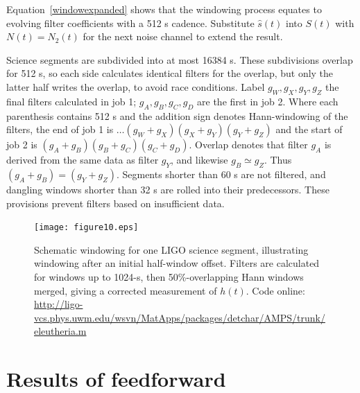 	Equation~\ref{windowexpanded} shows that the windowing process equates to evolving filter coefficients with a 512 s cadence. Substitute $\hat{s}(t)$ into $S(t)$ with $N(t) = N_2(t)$ for the next noise channel to extend the result.

            Science segments are subdivided into at most 16384 s. These subdivisions overlap for 512 s, so each side calculates identical filters for the overlap, but only the latter half writes the overlap, to avoid race conditions. Label $g_W, g_X, g_Y, g_Z$ the final filters calculated in job 1; $g_A, g_B, g_C, g_D$ are the first in job 2. Where each parenthesis contains 512 s and the addition sign denotes Hann-windowing of the filters, the end of job 1 is $\ldots(g_W+g_X)(g_X+g_Y)(g_Y+g_Z)$ and the start of job 2 is $(g_A+g_B)(g_B+g_C)(g_C+g_D)$. Overlap denotes that filter $g_A$ is derived from the same data as filter $g_Y$, and likewise $g_B \simeq g_Z$. Thus $(g_A+g_B)=(g_Y+g_Z)$. Segments shorter than 60 s are not filtered, and dangling windows shorter than 32 s are rolled into their predecessors. These provisions prevent filters based on insufficient data. 

\begin{figure}
\begin{center}
\texttt{[image: figure10.eps]}
\caption{Schematic windowing for one LIGO science segment, illustrating windowing after an initial half-window offset. Filters are calculated for windows up to 1024-s, then 50\%-overlapping Hann windows merged, giving a corrected measurement of $h(t)$. Code online: \url{http://ligo-vcs.phys.uwm.edu/wsvn/MatApps/packages/detchar/AMPS/trunk/eleutheria.m}}
\label{windowingScience}
\end{center}
\end{figure}

    \section{Results of feedforward}
    \label{all-results}

